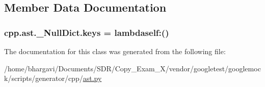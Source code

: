 \subsection{Member Data Documentation}
\subsubsection[{\texorpdfstring{keys}{keys}}]{\setlength{\rightskip}{0pt plus 5cm}cpp.\+ast.\+\_\+\+Null\+Dict.\+keys = lambdaself\+:()\hspace{0.3cm}{\ttfamily [static]}}\hypertarget{classcpp_1_1ast_1_1___null_dict_abb0b7884aa59bede0a8503dffcd1733f}{}\label{classcpp_1_1ast_1_1___null_dict_abb0b7884aa59bede0a8503dffcd1733f}


The documentation for this class was generated from the following file\+:\begin{DoxyCompactItemize}
\item 
/home/bhargavi/\+Documents/\+S\+D\+R/\+Copy\+\_\+\+Exam\+\_\+X/vendor/googletest/googlemock/scripts/generator/cpp/\hyperlink{ast_8py}{ast.\+py}\end{DoxyCompactItemize}
